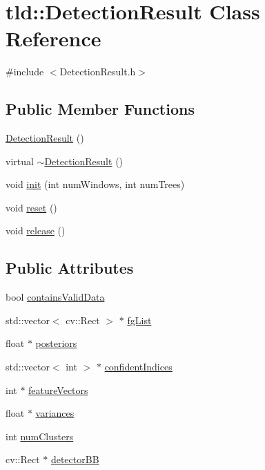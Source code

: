 \hypertarget{classtld_1_1_detection_result}{
\section{tld::DetectionResult Class Reference}
\label{classtld_1_1_detection_result}
}


{\ttfamily \#include $<$DetectionResult.h$>$}

\subsection*{Public Member Functions}
\begin{DoxyCompactItemize}
\item 
\hyperlink{classtld_1_1_detection_result_a603fdd04a64eb7e6c60ee7e9bb27d747}{DetectionResult} ()
\item 
virtual \hyperlink{classtld_1_1_detection_result_a6e76739d206edcdbbac3d2da474fa5ff}{$\sim$DetectionResult} ()
\item 
void \hyperlink{classtld_1_1_detection_result_a20c6fc21a478b99cf88b6e955931e530}{init} (int numWindows, int numTrees)
\item 
void \hyperlink{classtld_1_1_detection_result_afeda3b61ba3d7ba3304b96baf65d184b}{reset} ()
\item 
void \hyperlink{classtld_1_1_detection_result_a23dc924e308f7a2d8f3795fb48fb6648}{release} ()
\end{DoxyCompactItemize}
\subsection*{Public Attributes}
\begin{DoxyCompactItemize}
\item 
bool \hyperlink{classtld_1_1_detection_result_af5202404b0b269bd5f8c6b483356c517}{containsValidData}
\item 
std::vector$<$ cv::Rect $>$ $\ast$ \hyperlink{classtld_1_1_detection_result_ac640285c436ff5166d0ea34116d4dc69}{fgList}
\item 
float $\ast$ \hyperlink{classtld_1_1_detection_result_abe6b7a8cc4478cce6351207939e96333}{posteriors}
\item 
std::vector$<$ int $>$ $\ast$ \hyperlink{classtld_1_1_detection_result_aae986474ad532795e262e240a3ddb951}{confidentIndices}
\item 
int $\ast$ \hyperlink{classtld_1_1_detection_result_a2650bfbdb106c7dd9b774cfccf5fdb25}{featureVectors}
\item 
float $\ast$ \hyperlink{classtld_1_1_detection_result_ae0725362fbe07964e4ac6861fa1d32fb}{variances}
\item 
int \hyperlink{classtld_1_1_detection_result_aebf70a6b9d27b4cb34248ac26e5876ab}{numClusters}
\item 
cv::Rect $\ast$ \hyperlink{classtld_1_1_detection_result_ab3cade119a99e868902e6bca2e6271df}{detectorBB}
\end{DoxyCompactItemize}


